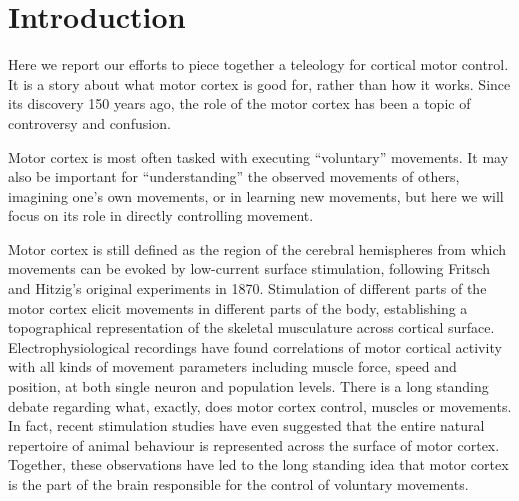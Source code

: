 \section{Introduction}

Here we report our efforts to piece together a teleology for cortical motor control. It is a story about what motor cortex is good for, rather than how it works. Since its discovery 150 years ago, the role of the motor cortex has been a topic of controversy and confusion.

Motor cortex is most often tasked with executing ``voluntary'' movements. It may also be important for ``understanding'' the observed movements of others, imagining one's own movements, or in learning new movements, but here we will focus on its role in directly controlling movement.

Motor cortex is still defined as the region of the cerebral hemispheres from which movements can be evoked by low-current surface stimulation, following Fritsch and Hitzig's original experiments in 1870. Stimulation of different parts of the motor cortex elicit movements in different parts of the body, establishing a topographical representation of the skeletal musculature across cortical surface. Electrophysiological recordings have found correlations of motor cortical activity with all kinds of movement parameters including muscle force, speed and position, at both single neuron and population levels. There is a long standing debate regarding what, exactly, does motor cortex control, muscles or movements. In fact, recent stimulation studies have even suggested that the entire natural repertoire of animal behaviour is represented across the surface of motor cortex. Together, these observations have led to the long standing idea that motor cortex is the part of the brain responsible for the control of voluntary movements.

